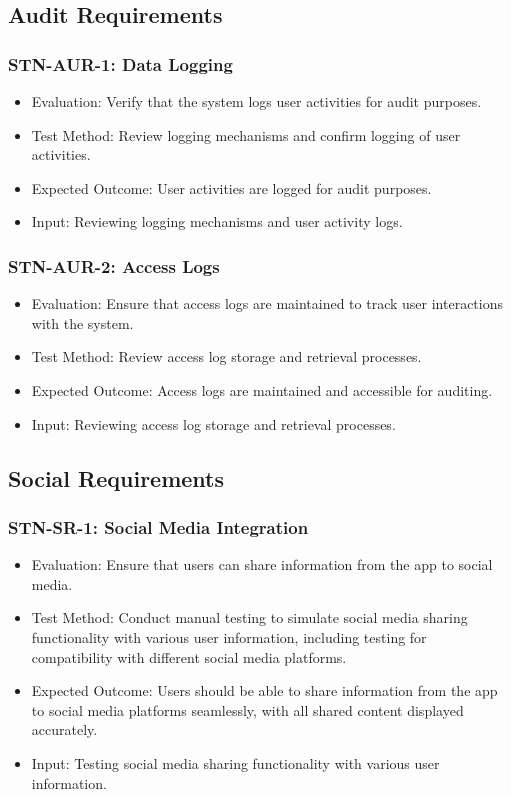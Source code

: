 \documentclass[12pt, titlepage]{article}
\begin{document}
\subsection{Audit Requirements}

\subsubsection{STN-AUR-1: Data Logging}
\begin{itemize}
    \item Evaluation: Verify that the system logs user activities for audit purposes.
    \item Test Method: Review logging mechanisms and confirm logging of user activities.
    \item Expected Outcome: User activities are logged for audit purposes.
    \item Input: Reviewing logging mechanisms and user activity logs.
\end{itemize}

\subsubsection{STN-AUR-2: Access Logs}
\begin{itemize}
    \item Evaluation: Ensure that access logs are maintained to track user interactions with the system.
    \item Test Method: Review access log storage and retrieval processes.
    \item Expected Outcome: Access logs are maintained and accessible for auditing.
    \item Input: Reviewing access log storage and retrieval processes.
\end{itemize}

\subsection{Social Requirements}

\subsubsection{STN-SR-1: Social Media Integration}
\begin{itemize}
    \item Evaluation: Ensure that users can share information from the app to social media.
    \item Test Method: Conduct manual testing to simulate social media sharing functionality with various user information, including testing for compatibility with different social media platforms.
    \item Expected Outcome: Users should be able to share information from the app to social media platforms seamlessly, with all shared content displayed accurately.
    \item Input: Testing social media sharing functionality with various user information.
\end{itemize}
	
\end{document}
